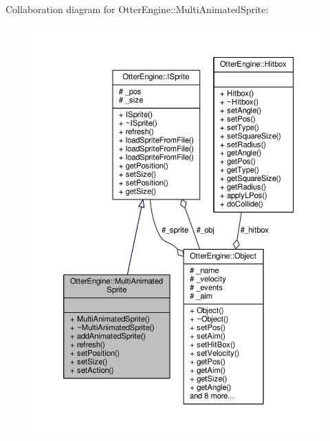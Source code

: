 Collaboration diagram for Otter\+Engine\+:\+:Multi\+Animated\+Sprite\+:\nopagebreak
\begin{figure}[H]
\begin{center}
\leavevmode
\includegraphics[width=350pt]{d6/d47/class_otter_engine_1_1_multi_animated_sprite__coll__graph}
\end{center}
\end{figure}

